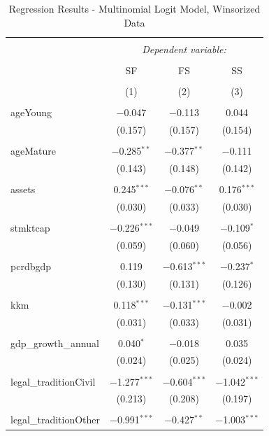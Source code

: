 \documentclass[a4paper, nobind]{templates/ociamthesis}
\begin{document}
\begin{table}[!htbp] \centering 
  \caption{Regression Results - Multinomial Logit Model, Winsorized Data} 
  \label{} 
\footnotesize 
\begin{tabular}{@{\extracolsep{5pt}}lccc} 
\\[-1.8ex]\hline 
\hline \\[-1.8ex] 
 & \multicolumn{3}{c}{\textit{Dependent variable:}} \\ 
\cline{2-4} 
\\[-1.8ex] & SF & FS & SS \\ 
\\[-1.8ex] & (1) & (2) & (3)\\ 
\hline \\[-1.8ex] 
 ageYoung & $-$0.047 & $-$0.113 & 0.044 \\ 
  & (0.157) & (0.157) & (0.154) \\ 
  & & & \\ 
 ageMature & $-$0.285$^{**}$ & $-$0.377$^{**}$ & $-$0.111 \\ 
  & (0.143) & (0.148) & (0.142) \\ 
  & & & \\ 
 assets & 0.245$^{***}$ & $-$0.076$^{**}$ & 0.176$^{***}$ \\ 
  & (0.030) & (0.033) & (0.030) \\ 
  & & & \\ 
 stmktcap & $-$0.226$^{***}$ & $-$0.049 & $-$0.109$^{*}$ \\ 
  & (0.059) & (0.060) & (0.056) \\ 
  & & & \\ 
 pcrdbgdp & 0.119 & $-$0.613$^{***}$ & $-$0.237$^{*}$ \\ 
  & (0.130) & (0.131) & (0.126) \\ 
  & & & \\ 
 kkm & 0.118$^{***}$ & $-$0.131$^{***}$ & $-$0.002 \\ 
  & (0.031) & (0.033) & (0.031) \\ 
  & & & \\ 
 gdp\_growth\_annual & 0.040$^{*}$ & $-$0.018 & 0.035 \\ 
  & (0.024) & (0.025) & (0.024) \\ 
  & & & \\ 
 legal\_traditionCivil & $-$1.277$^{***}$ & $-$0.604$^{***}$ & $-$1.042$^{***}$ \\ 
  & (0.213) & (0.208) & (0.197) \\ 
  & & & \\ 
 legal\_traditionOther & $-$0.991$^{***}$ & $-$0.427$^{**}$ & $-$1.003$^{***}$ \\ 

\end{tabular}
\end{table}
\end{document}
